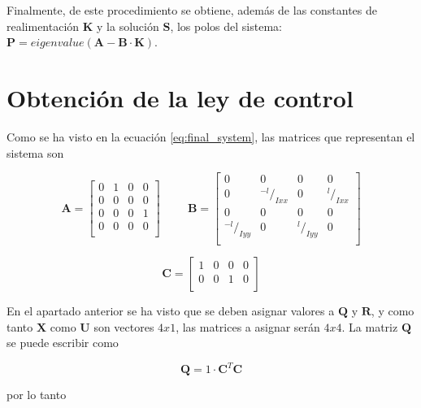 \documentclass[twoside,11pt]{book}
\begin{document}
Finalmente, de este procedimiento se obtiene, además de las constantes de realimentación $\mathbf{K}$ y la solución $\mathbf{S}$, los polos del sistema: $\mathbf{P}=eigenvalue( \mathbf{A} - \mathbf{B} \cdot \mathbf{K})$.


\section{Obtención de la ley de control}

Como se ha visto en la ecuación \ref{eq:final_system}, las matrices que representan el sistema son

\begin{equation}
\pmb{A}= \left[ \begin{array}{cccc}
0 & 1 & 0 & 0 \\
0 & 0 & 0 & 0 \\
0 & 0 & 0 & 1 \\
0 & 0 & 0 & 0 \\ \end{array} \right] \hspace{1cm} \pmb{B}=\left[ \begin{array}{cccc}
0 & 0 & 0 & 0 \\
0 & {}^{-l}/_{Ixx} & 0 & {}^{l}/_{Ixx} \\ 
0 & 0 & 0 & 0 \\
{}^{-l}/_{Iyy} & 0 & {}^{l}/_{Iyy} & 0 \\ \end{array} \right] 
\end{equation} 

\begin{equation}
\nonumber
\pmb{C}=\left[ \begin{array}{cccc}
1 & 0 & 0 & 0 \\
0 & 0 & 1 & 0 \\ \end{array} \right] 
\end{equation} 

En el apartado anterior se ha visto que se deben asignar valores a $\mathbf{Q}$ y $\mathbf{R}$, y como tanto $\mathbf{X}$ como $\mathbf{U}$ son vectores $4x1$, las matrices a asignar serán $4x4$. La matriz $\mathbf{Q}$ se puede escribir como 

\begin{equation}
\mathbf{Q}=1 \cdot \pmb{C}^{T}\pmb{C}
\end{equation}

por lo tanto 
\end{document}
